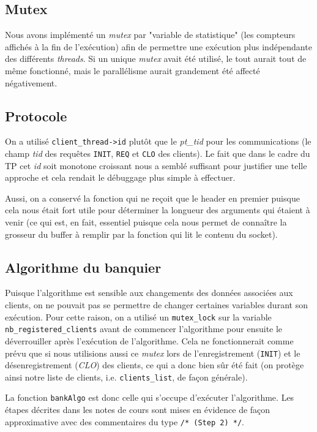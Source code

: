 \documentclass[11pt]{article}
\begin{document}
\subsection{Mutex}

Nous avons implémenté un \textit{mutex} par "variable de statistique" (les compteurs affichés à la fin de l'exécution) afin de permettre une exécution plus indépendante des différents \textit{threads}. Si un unique \textit{mutex} avait été utilisé, le tout aurait tout de même fonctionné, mais le parallélisme aurait grandement été affecté négativement.


\subsection{Protocole}

On a utilisé \texttt{client\_thread->id} plutôt que le \textit{pt\_tid} pour les communications (le champ \textit{tid} des requêtes \texttt{INIT}, \texttt{REQ} et \texttt{CLO} des clients). Le fait que dans le cadre du TP cet \textit{id} soit monotone croissant nous a semblé suffisant pour justifier une telle approche et cela rendait le débuggage plus simple à effectuer.

Aussi, on a conservé la fonction qui ne reçoit que le header en premier puisque cela nous était fort utile pour déterminer la longueur
des arguments qui étaient à venir (ce qui est, en fait, essentiel puisque cela nous permet de connaître la grosseur du buffer à remplir par la fonction qui lit le contenu du socket).


\subsection{Algorithme du banquier}

Puisque l'algorithme est sensible aux changements des données associées aux clients, on ne pouvait pas se permettre de changer certaines variables durant son exécution. Pour cette raison, on a utilisé un \texttt{mutex\_lock} sur la variable \texttt{nb\_registered\_clients} avant de commencer l'algorithme pour ensuite le déverrouiller après l'exécution de l'algorithme. Cela ne fonctionnerait comme prévu que si nous utilisions aussi ce \textit{mutex} lors de l'enregistrement (\texttt{INIT}) et le désenregistrement (\textit{CLO}) des clients, ce qui a donc bien sûr été fait (on protège ainsi notre liste de clients, i.e. \texttt{clients\_list}, de façon générale).

La fonction \texttt{bankAlgo} est donc celle qui s'occupe d'exécuter l'algorithme. Les étapes décrites dans les notes de cours sont mises en évidence de façon approximative avec des commentaires du type \texttt{/* (Step 2) */}.
\end{document}
